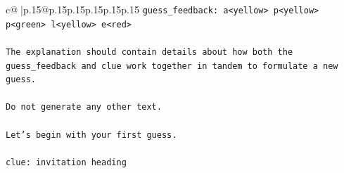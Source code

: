 \documentclass{article}
\begin{document}
{\begin{supertabular}{c@{$\;$}|p{.15\linewidth}@{}p{.15\linewidth}p{.15\linewidth}p{.15\linewidth}p{.15\linewidth}p{.15\linewidth}}
{{{\texttt{guess\_feedback: a<yellow> p<yellow> p<green> l<yellow> e<red>} \\
\\ 
\texttt{The explanation should contain details about how both the guess\_feedback and clue work together in tandem to formulate a new guess.} \\
\\ 
\texttt{Do not generate any other text.} \\
\\ 
\texttt{Let's begin with your first guess.} \\
\\ 
\texttt{clue: invitation heading} \\
            }
        }
    }
     \\ \\


\end{supertabular}}
\end{document}
